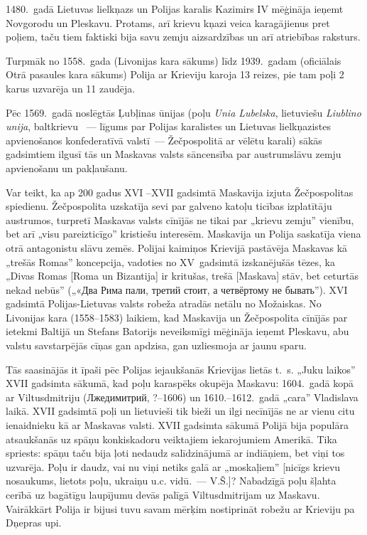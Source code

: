 \documentclass[twoside,a5paper,12pt,fleqn,openany]{extbook}
\newcommand{\pltxti}[1]{\textit{\textpolish{#1}}}
\newcommand{\rutxti}[1]{\textrussian{#1}}
\newcommand{\lttxti}[1]{\textit{\textlithuanian{#1}}}
\newcommand{\betxti}[1]{\textbelarusian{#1}}
\begin{document}
1480.~gadā Lietuvas lielkņazs un Polijas karalis Kazimirs IV mēģināja ieņemt Novgorodu un Pleskavu. Protams, arī krievu kņazi veica karagājienus pret poļiem, taču tiem faktiski bija savu zemju aizsardzības un arī atriebības raksturs.

Turpmāk no 1558.~gada (Livonijas kara sākums) līdz 1939.~gadam (oficiālais Otrā pasaules kara sākums) Polija ar Krieviju karoja 13 reizes, pie tam poļi 2 karus uzvarēja un 11 zaudēja.

Pēc 1569.~gadā noslēgtās Ļubļinas ūnijas (poļu \pltxti{Unia Lubelska}, lietuviešu \lttxti{Liublino unija}, baltkrievu \betxti{Люблінская унія}~--- līgums par Polijas karalistes un Lietuvas lielkņazistes apvienošanos konfederatīvā valstī~--- Žečpospolitā ar vēlētu karali) sākās gadsimtiem ilgusī tās un Maskavas valsts sāncensība par austrumslāvu zemju apvienošanu un pakļaušanu.

Var teikt, ka ap 200 gadus XVI --XVII gadsimtā Maskavija izjuta Žečpospolitas spiedienu. Žečpospolita uzskatīja sevi par galveno katoļu ticības izplatītāju austrumos, turpretī Maskavas valsts cīnījās ne tikai par „krievu zemju” vienību, bet arī „visu pareizticīgo” kristiešu interesēm. Maskavija un Polija saskatīja viena otrā antagonistu slāvu zemēs. Polijai kaimiņos Krievijā pastāvēja Maskavas kā „trešās Romas” koncepcija, vadoties no XV~gadsimtā izskanējušās tēzes, ka „Divas Romas [Roma un Bizantija] ir kritušas, trešā [Maskava] stāv, bet ceturtās nekad nebūs” („\rutxti{«Два Рима пали, третий стоит, а четвёртому не бывать}”). XVI gadsimtā Polijas-Lietuvas valsts robeža atradās netālu no Možaiskas. No Livonijas kara (1558--1583) laikiem, kad Maskavija un Žečpospolita cīnījās par ietekmi Baltijā un Stefans Batorijs neveiksmīgi mēģināja ieņemt Pleskavu, abu valstu savstarpējās cīņas gan apdzisa, gan uzliesmoja ar jaunu sparu.

Tās saasinājās it īpaši pēc Polijas iejaukšanās Krievijas lietās t.~s. „Juku laikos” XVII gadsimta sākumā, kad poļu karaspēks okupēja Maskavu: 1604.~gadā kopā ar Viltusdmitriju (\rutxti{Лжедимитрий}, ?--1606) un 1610.--1612.~gadā „cara” Vladislava laikā. XVII gadsimtā poļi un lietuvieši tik bieži un ilgi necīnījās ne ar vienu citu ienaidnieku kā ar Maskavas valsti. XVII gadsimta sākumā Polijā bija populāra atsaukšanās uz spāņu konkiskadoru veiktajiem iekarojumiem Amerikā. Tika spriests: spāņu taču bija ļoti nedaudz salīdzinājumā ar indiāņiem, bet viņi tos uzvarēja. Poļu ir daudz, vai nu viņi netiks galā ar „moskaļiem” [nicīgs krievu nosaukums, lietots poļu, ukraiņu u.c. vidū.~--- V.Š.]? Nabadzīgā poļu šļahta cerībā uz bagātīgu laupījumu devās palīgā Viltusdmitrijam uz Maskavu. Vairākkārt Polija ir bijusi tuvu savam mērķim nostiprināt robežu ar Krieviju pa Dņepras upi.
\end{document}
